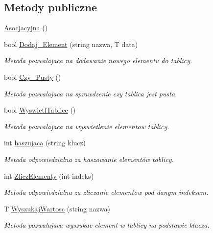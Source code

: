 \subsection*{\-Metody publiczne}
\begin{DoxyCompactItemize}
\item 
\hyperlink{class_asocjacyjna_a0824d169fa70e63f11ef599771b77a4c}{\-Asocjacyjna} ()
\item 
bool \hyperlink{class_asocjacyjna_a0ffdfd5c19349dcbc2b0e7b88d7ff0eb}{\-Dodaj\-\_\-\-Element} (string nazwa, \-T data)
\begin{DoxyCompactList}\small\item\em \-Metoda pozwalajaca na dodawanie nowego elementu do tablicy. \end{DoxyCompactList}\item 
bool \hyperlink{class_asocjacyjna_ad0942ec050a1066e594d19807afc1a2e}{\-Czy\-\_\-\-Pusty} ()
\begin{DoxyCompactList}\small\item\em \-Metoda pozwalajaca na sprawdzenie czy tablica jest pusta. \end{DoxyCompactList}\item 
bool \hyperlink{class_asocjacyjna_a30c921591e105752225828d2e68d635a}{\-Wyswietl\-Tablice} ()
\begin{DoxyCompactList}\small\item\em \-Metoda pozwalajaca na wyswietlenie elementow tablicy. \end{DoxyCompactList}\item 
int \hyperlink{class_asocjacyjna_a2013aece90d2fdf0e1958ad80727fabe}{haszujaca} (string klucz)
\begin{DoxyCompactList}\small\item\em \-Metoda odpowiedzialna za haszowanie elementów tablicy. \end{DoxyCompactList}\item 
int \hyperlink{class_asocjacyjna_abb11a873d0e231a8a9c4f3e169145c2d}{\-Zlicz\-Elementy} (int indeks)
\begin{DoxyCompactList}\small\item\em \-Metoda odpowiedzialna za zliczanie elementow pod danym indeksem. \end{DoxyCompactList}\item 
\-T \hyperlink{class_asocjacyjna_ad661deb3efee94cd2162a920ad965be5}{\-Wyszukaj\-Wartosc} (string nazwa)
\begin{DoxyCompactList}\small\item\em \-Metoda pozwalajaca wyszukac element w tablicy na podstawie klucza. \end{DoxyCompactList}\item 

\end{DoxyCompactItemize}
